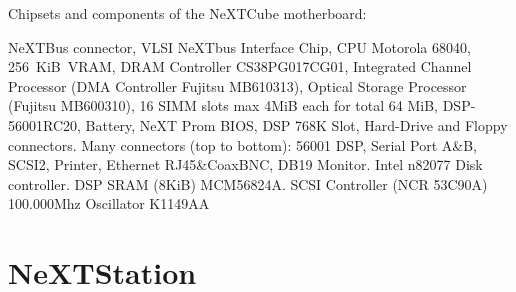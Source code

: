 \vspace{50 mm}
\par
Chipsets and components of the NeXTCube motherboard:\\
\par 
{} NeXTBus connector,
 VLSI NeXTbus Interface Chip,
 CPU Motorola 68040,
 256~KiB~VRAM,
 DRAM Controller CS38PG017CG01,
 Integrated Channel Processor (DMA Controller Fujitsu MB610313),
 Optical Storage Processor (Fujitsu MB600310),
 16 SIMM slots max 4MiB each for total 64 MiB,
 DSP-56001RC20,
 Battery,
 NeXT Prom BIOS,
 DSP 768K Slot,
 Hard-Drive and Floppy connectors.
 Many connectors (top to bottom): 56001 DSP, Serial Port A\&B, SCSI2, Printer, Ethernet RJ45\&CoaxBNC, DB19 Monitor. 
 Intel n82077 Disk controller.
 DSP SRAM (8KiB) MCM56824A.
 SCSI Controller (NCR 53C90A)
 100.000Mhz Oscillator K1149AA






\section{NeXTStation}

